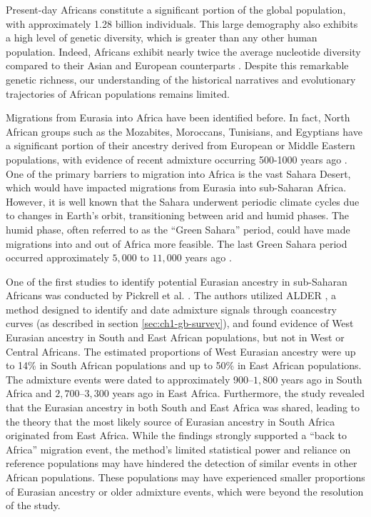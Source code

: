 Present-day Africans constitute a significant portion of the global population, with approximately 1.28 billion individuals.
%
This large demography also exhibits a high level of genetic diversity, which is greater than any other human population.
%
Indeed, Africans exhibit nearly twice the average nucleotide diversity compared to their Asian and European counterparts \cite{yu2002larger}. 
%
Despite this remarkable genetic richness, our understanding of the historical narratives and evolutionary trajectories of African populations remains limited. 


Migrations from Eurasia into Africa have been identified before. 
%
In fact, North African groups such as the Mozabites, Moroccans, Tunisians, and Egyptians have a significant portion of their ancestry derived from European or Middle Eastern populations, with evidence of recent admixture occurring 500-1000 years ago \cite{price2009sensitive, hellenthal2014genetic, salter2019fine}. 
%
One of the primary barriers to migration into Africa is the vast Sahara Desert, which would have impacted migrations from Eurasia into sub-Saharan Africa.
%
However, it is well known that the Sahara underwent periodic climate cycles due to changes in Earth's orbit, transitioning between arid and humid phases. 
%
The humid phase, often referred to as the ``Green Sahara'' period, could have made migrations into and out of Africa more feasible. The last Green Sahara period occurred approximately $5{,}000$ to $11{,}000$ years ago \cite{tierney2017rainfall, larrasoana2013dynamics}.

One of the first studies to identify potential Eurasian ancestry in sub-Saharan Africans was conducted by Pickrell et al. \cite{pickrell2012genetic, pickrell2014ancient}. The authors utilized ALDER \cite{loh2013inferring}, a method designed to identify and date admixture signals through coancestry curves (as described in section \ref{sec:ch1-gb-survey}), and found evidence of West Eurasian ancestry in South and East African populations, but not in West or Central Africans. The estimated proportions of West Eurasian ancestry were up to 14\% in South African populations and up to 50\% in East African populations. The admixture events were dated to approximately 900--$1{,}800$ years ago in South Africa and $2{,}700$--$3{,}300$ years ago in East Africa. Furthermore, the study revealed that the Eurasian ancestry in both South and East Africa was shared, leading to the theory that the most likely source of Eurasian ancestry in South Africa originated from East Africa. While the findings strongly supported a ``back to Africa'' migration event, the method’s limited statistical power and reliance on reference populations may have hindered the detection of similar events in other African populations. These populations may have experienced smaller proportions of Eurasian ancestry or older admixture events, which were beyond the resolution of the study.

